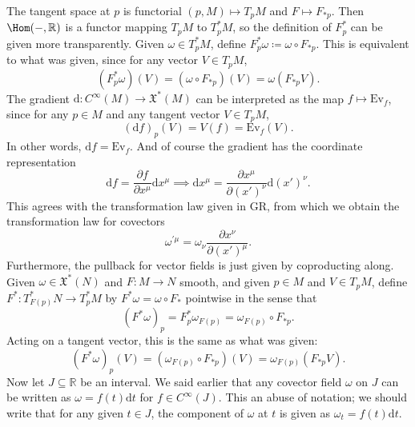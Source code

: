 \begin{remark}
The tangent space at $p$ is functorial $(p,M)\mapsto T_pM$ and $F\mapsto F_{*p} $. Then $\Hom(-, \mathbb{R} ) $ is a functor mapping $T_pM$ to $T_p^*M$, so the definition of $F^*_p$ can be given more transparently. Given $\omega \in T_p^*M$, define $F^*_p\omega \coloneqq \omega \circ F_{*p} $. This is equivalent to what was given, since for any vector $V\in T_pM$,
\[
	(F^*_p\omega )(V)=(\omega \circ F_{*p} )(V)=\omega (F_{*p} V)
.\]
The gradient $\mathrm{d} : C^\infty (M) \to \mathfrak{X} ^*(M)$ can be interpreted as the map $f\mapsto \mathrm{Ev} _f$, since for any $p\in M$ and any tangent vector $V\in T_pM$,
\[
	(\mathrm{d} f)_p(V)=V(f)=\mathrm{Ev} _f(V)
.\]
In other words, $\mathrm{d} f=\mathrm{Ev} _f$. And of course the gradient has the coordinate representation
\[
	\mathrm{d} f= \frac{\partial f}{\partial x^\mu } \mathrm{d} x^\mu \implies \mathrm{d} x^\mu =\frac{\partial x^\mu }{\partial (x')^\nu } \mathrm{d} (x')^\nu 
.\]
This agrees with the transformation law given in GR, from which we obtain the transformation law for covectors
\[
	\omega ^{\prime \mu } =\omega _\nu \frac{\partial x^\nu }{\partial (x')^\mu } 
.\]
Furthermore, the pullback for vector fields is just given by coproducting along. Given $\omega \in \mathfrak{X} ^*(N)$ and $F : M \to N$ smooth, and given $p\in M$ and $V\in T_pM$, define $F^*: T_{F(p)} ^*N \to T_p^*M$ by $F^*\omega =\omega \circ F_{*} $ pointwise in the sense that
\[
	(F^*\omega )_p=F^*_p\omega _{F(p)} =\omega _{F(p)} \circ F_{*p} 
.\]
Acting on a tangent vector, this is the same as what was given:
\[
	(F^*\omega )_p(V)=(\omega_{F(p)} \circ F_{*p} )(V)=\omega _{F(p)} (F_{*p} V)
.\]
Now let $J\subseteq \mathbb{R} $ be an interval. We said earlier that any covector field $\omega $ on $J$ can be written as $\omega =f(t)\mathrm{d} t$ for $f\in C^\infty (J)$. This an abuse of notation; we should write that for any given $t\in J$, the component of $\omega $ at $t$ is given as $\omega _t=f(t)\mathrm{d} t$. 
\end{remark}
